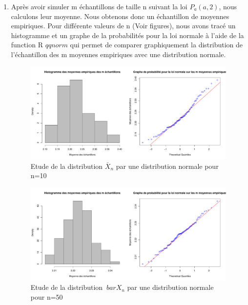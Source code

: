 \documentclass[12pt]{article}
\begin{document}
\begin{enumerate}
\item
Apr\`{e}s avoir simuler m \'{e}chantillons de taille n suivant la loi $P_a(a,2)$, nous calculons leur moyenne. Nous obtenons donc un \'{e}chantillon de  moyennes empiriques. Pour diff\'{e}rente valeurs de n (Voir figures), nous avons trac\'{e} un histogramme et un graphe de la probabilit\'{e}s pour la loi normale  \`{a} l'aide de la function R $qqnorm$ qui permet de comparer graphiquement la distribution de l'\'{e}chantillon des m moyennes empiriques avec une distribution normale.
\\

\begin{figure}[!h]
\centering
\includegraphics[width=1.0\textwidth]{figures/GraphP2Q52.pdf}
\caption{Etude de la distribution $ \bar X_n$ par une distribution normale pour n=10}
\end{figure}

\begin{figure}[!h]
\centering
\includegraphics[width=1.0\textwidth]{figures/GraphP2Q53.pdf}
\caption{Etude de la distribution $\ bar X_n$ par une distribution normale pour n=50}
\end{figure}


\end{enumerate}
\end{document}
